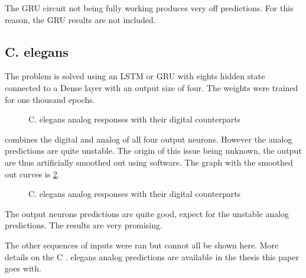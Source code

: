 The GRU circuit not being fully working produces very off predictions. For this reason, the GRU results are not included.

\subsection{C. elegans}

The problem is solved using an LSTM or GRU with eights hidden state connected to a Dense layer with an output size of four. The weights were trained for one thousand epochs.

\begin{figure}[h]
  \centering
  
  \caption{\acs{C. elegans} analog responses with their digital counterparts}
  \label{graph:celegansAnalog0}
\end{figure}

 combines the digital and analog of all four output neurons. However the analog predictions are quite unstable. The origin of this issue being unknown, the output are thus artificially smoothed out using software. The graph with the smoothed out curves is \cref{graph:celegansAnalog1}.

\begin{figure}[h]
  \centering
  
  \caption{\acs{C. elegans} analog responses with their digital counterparts}
  \label{graph:celegansAnalog1}
\end{figure}

The output neurons predictions are quite good, expect for the unstable analog predictions. The results are very promising.

The other sequences of inputs were ran but connot all be shown here. More details on the C . elegans analog predictions are available in the thesis this paper goes with.
